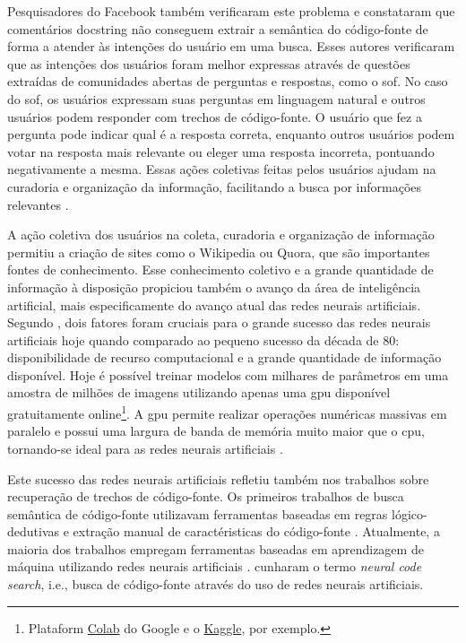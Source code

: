 Pesquisadores do Facebook \citep{cambronero-deep-learning-code-search:2019} também verificaram este problema e constataram que comentários \gls{docstring} não conseguem extrair a semântica do código-fonte de forma a atender às intenções do usuário em uma busca. Esses autores verificaram que as intenções dos usuários foram melhor expressas através de questões extraídas de comunidades abertas de perguntas e respostas, como o \gls{sof}. No caso do \Gls{sof}, os usuários expressam suas perguntas em linguagem natural e outros usuários podem responder com trechos de código-fonte. O usuário que fez a pergunta pode indicar qual é a resposta correta, enquanto outros usuários podem votar na resposta mais relevante ou eleger uma resposta incorreta, pontuando negativamente a mesma. Essas ações coletivas feitas pelos usuários ajudam na curadoria e organização da informação, facilitando a busca por informações relevantes \citep{Wang-quora:2013, cambronero-deep-learning-code-search:2019}. 

A ação coletiva dos usuários na coleta, curadoria e organização de informação permitiu a criação de sites como o Wikipedia ou Quora, que são importantes fontes de conhecimento. Esse conhecimento coletivo e a grande quantidade de informação à disposição propiciou também o avanço da área de inteligência artificial, mais especificamente do avanço atual das redes neurais artificiais. Segundo \cite{Goodfellow-et-al-2016}, dois fatores foram cruciais para o grande sucesso das redes neurais artificiais hoje quando comparado ao pequeno sucesso da década de 80: disponibilidade de recurso computacional e a grande quantidade de informação disponível. Hoje é possível treinar modelos com milhares de parâmetros em uma amostra de milhões de imagens utilizando apenas uma \acrshort{gpu} disponível gratuitamente online\footnote{Plataform \href{https://colab.research.google.com/}{Colab} do Google e o \href{https://www.kaggle.com/}{Kaggle}, por exemplo.}. A \acrshort{gpu} permite realizar operações numéricas massivas em paralelo e possui uma largura de banda de memória muito maior que o \acrshort{cpu}, tornando-se ideal para as redes neurais artificiais \citep{Goodfellow-et-al-2016}.

Este sucesso das redes neurais artificiais refletiu também nos trabalhos sobre recuperação de trechos de código-fonte. Os primeiros trabalhos de busca semântica de código-fonte utilizavam ferramentas baseadas em regras lógico-dedutivas e extração manual de caractéristicas do código-fonte \citep{Allamanis:2018:SML}. Atualmente, a maioria dos trabalhos empregam ferramentas baseadas em aprendizagem de máquina utilizando redes neurais artificiais \citep{Gu-deep-code-search:2018, yao-2018, iyer-etal-2016-summarizing, Allamanis-bimodal-source-code-natural-language:2015, Chen-bi-variational-autoencoder:2018, Sachdev-neural-code-search:2018, cambronero-deep-learning-code-search:2019}. \cite{cambronero-deep-learning-code-search:2019} cunharam o termo \textit{neural code search}, i.e., busca de código-fonte através do uso de redes neurais artificiais.


